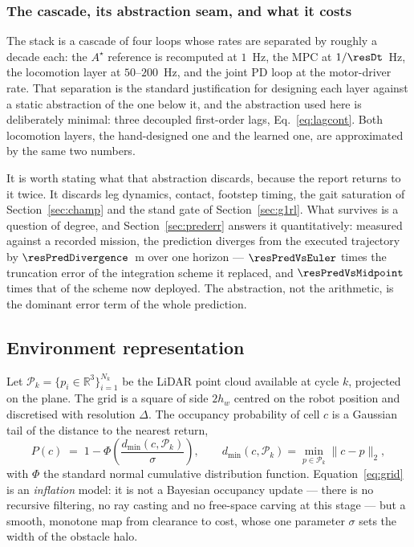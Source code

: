\documentclass[11pt,a4paper]{article}
\newcommand{\R}{\mathbb{R}}
\newcommand{\astar}{$A^\star$}
\begin{document}
\subsubsection{The cascade, its abstraction seam, and what it costs}
\label{sec:cascade}

The stack is a cascade of four loops whose rates are separated by roughly a decade each: the \astar{}
reference is recomputed at $1$~Hz, the MPC at $1/\resDt$~Hz, the locomotion layer at $50$--$200$~Hz, and the
joint PD loop at the motor-driver rate. That separation is the standard justification for designing each
layer against a static abstraction of the one below it, and the abstraction used here is deliberately
minimal: three decoupled first-order lags, Eq.~\eqref{eq:lagcont}. Both locomotion layers, the hand-designed
one and the learned one, are approximated by the same two numbers.

It is worth stating what that abstraction discards, because the report returns to it twice. It discards leg
dynamics, contact, footstep timing, the gait saturation of Section~\ref{sec:champ} and the stand gate of
Section~\ref{sec:g1rl}. What survives is a question of degree, and Section~\ref{sec:prederr} answers it
quantitatively: measured against a recorded mission, the prediction diverges from the executed trajectory by
$\resPredDivergence$~m over one horizon --- $\resPredVsEuler$ times the truncation error of the integration
scheme it replaced, and $\resPredVsMidpoint$ times that of the scheme now deployed. The abstraction, not the
arithmetic, is the dominant error term of the whole prediction.

\subsection{Environment representation}
\label{sec:grid}

Let $\mathcal{P}_k=\{p_i\in\R^3\}_{i=1}^{N_k}$ be the LiDAR point cloud available at cycle $k$, projected on
the plane. The grid is a square of side $2h_w$ centred on the robot position and discretised with resolution
$\Delta$. The occupancy probability of cell $c$ is a Gaussian tail of the distance to the nearest return,
\begin{equation}
  P(c) \;=\; 1-\Phi\!\left(\frac{d_{\min}(c,\mathcal{P}_k)}{\sigma}\right),
  \qquad d_{\min}(c,\mathcal{P}_k)=\min_{p\in\mathcal{P}_k}\|c-p\|_2 ,
  \label{eq:grid}
\end{equation}
with $\Phi$ the standard normal cumulative distribution function. Equation~\eqref{eq:grid} is an
\emph{inflation} model: it is not a Bayesian occupancy update --- there is no recursive filtering, no ray
casting and no free-space carving at this stage --- but a smooth, monotone map from clearance to cost, whose
one parameter $\sigma$ sets the width of the obstacle halo.
\end{document}
